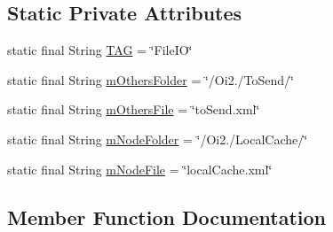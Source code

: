 \subsection*{Static Private Attributes}
\begin{DoxyCompactItemize}
\item 
static final String \hyperlink{classcom_1_1copelabs_1_1oiframework_1_1contentmanager_1_1_file_i_o_a3c9a4822f7f3f13c35b80a570bb99304}{T\+A\+G} = \char`\"{}File\+I\+O\char`\"{}
\item 
static final String \hyperlink{classcom_1_1copelabs_1_1oiframework_1_1contentmanager_1_1_file_i_o_af98e1837f90964eaf6beba0ad81a3ac9}{m\+Others\+Folder} = \char`\"{}/Oi2./To\+Send/\char`\"{}
\item 
static final String \hyperlink{classcom_1_1copelabs_1_1oiframework_1_1contentmanager_1_1_file_i_o_a41aaa3ff7b140dc3009f95e2912c990a}{m\+Others\+File} = \char`\"{}to\+Send.\+xml\char`\"{}
\item 
static final String \hyperlink{classcom_1_1copelabs_1_1oiframework_1_1contentmanager_1_1_file_i_o_ad6cb05ca533191482a2b76523fe3b7e0}{m\+Node\+Folder} = \char`\"{}/Oi2./Local\+Cache/\char`\"{}
\item 
static final String \hyperlink{classcom_1_1copelabs_1_1oiframework_1_1contentmanager_1_1_file_i_o_aa396e0baa0ebe01bcf618463926ca687}{m\+Node\+File} = \char`\"{}local\+Cache.\+xml\char`\"{}
\end{DoxyCompactItemize}


\subsection{Member Function Documentation}
\hypertarget{classcom_1_1copelabs_1_1oiframework_1_1contentmanager_1_1_file_i_o_af5945c991b9583e337bc8338b56003c9}{}
